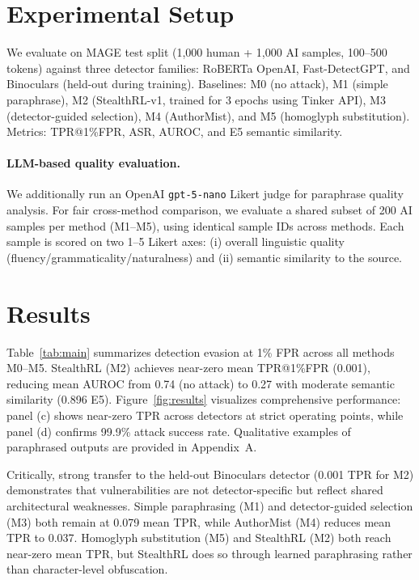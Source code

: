 \documentclass{article} %
\begin{document}
\section{Experimental Setup}
We evaluate on MAGE test split (1,000 human + 1,000 AI samples, 100--500 tokens) \cite{li2024magemachinegeneratedtextdetection} against three detector families: RoBERTa OpenAI, Fast-DetectGPT, and Binoculars (held-out during training). \cite{mitchell2023detectgptzeroshotmachinegeneratedtext,bao2024fastdetectgptefficientzeroshotdetection,hans2024spottingllmsbinocularszeroshot} Baselines: M0 (no attack), M1 (simple paraphrase), M2 (StealthRL-v1, trained for 3 epochs using Tinker API), M3 (detector-guided selection), M4 (AuthorMist), and M5 (homoglyph substitution). \cite{david2025authormistevadingaitext,cheng2025adversarialparaphrasinguniversalattack,creo2025silverspeakevadingaigeneratedtext} Metrics: TPR@1\%FPR, ASR, AUROC, and E5 semantic similarity.

\paragraph{LLM-based quality evaluation.} We additionally run an OpenAI \texttt{gpt-5-nano} Likert judge for paraphrase quality analysis. For fair cross-method comparison, we evaluate a shared subset of 200 AI samples per method (M1--M5), using identical sample IDs across methods. Each sample is scored on two 1--5 Likert axes: (i) overall linguistic quality (fluency/grammaticality/naturalness) and (ii) semantic similarity to the source.

\section{Results}
Table~\ref{tab:main} summarizes detection evasion at 1\% FPR across all methods M0--M5. StealthRL (M2) achieves near-zero mean TPR@1\%FPR (0.001), reducing mean AUROC from 0.74 (no attack) to 0.27 with moderate semantic similarity (0.896 E5). Figure~\ref{fig:results} visualizes comprehensive performance: panel (c) shows near-zero TPR across detectors at strict operating points, while panel (d) confirms 99.9\% attack success rate. Qualitative examples of paraphrased outputs are provided in Appendix~A.

Critically, strong transfer to the held-out Binoculars detector (0.001 TPR for M2) demonstrates that vulnerabilities are not detector-specific but reflect shared architectural weaknesses. Simple paraphrasing (M1) and detector-guided selection (M3) both remain at 0.079 mean TPR, while AuthorMist (M4) reduces mean TPR to 0.037. Homoglyph substitution (M5) and StealthRL (M2) both reach near-zero mean TPR, but StealthRL does so through learned paraphrasing rather than character-level obfuscation.
\end{document}
